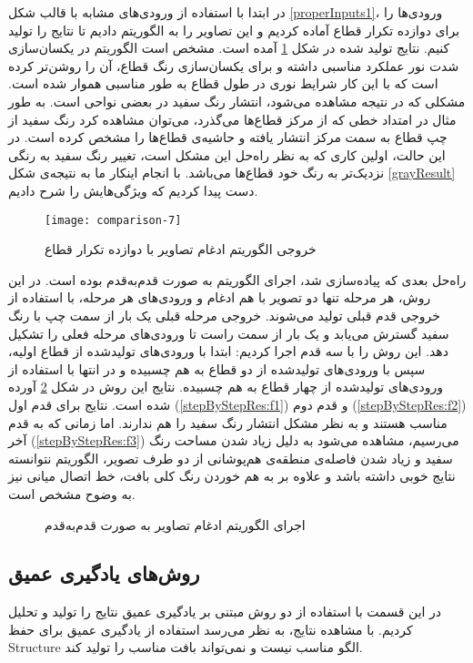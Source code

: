 در ابتدا با استفاده از ورودی‌های مشابه با قالب شکل \ref{properInputs1}، ورودی‌ها را برای دوازده تکرار قطاع آماده کردیم و این تصاویر را به الگوریتم دادیم تا نتایج را تولید کنیم. نتایج تولید شده در شکل \ref{twelveRep} آمده است. مشخص است الگوریتم در یکسان‌سازی شدت نور عملکرد مناسبی داشته و برای یکسان‌سازی رنگ قطاع، آن را روشن‌تر کرده است که با این کار شرایط نوری در طول قطاع به طور مناسبی هموار شده است. مشکلی که در نتیجه مشاهده می‌شود، انتشار رنگ سفید در بعضی نواحی است. به طور مثال در امتداد خطی که از مرکز قطاع‌ها می‌گذرد، می‌توان مشاهده کرد رنگ سفید از چپ قطاع به سمت مرکز انتشار یافته و حاشیه‌ی قطاع‌ها را مشخص کرده است. در این حالت، اولین کاری که به نظر راه‌حل این مشکل است، تغییر رنگ سفید به رنگی نزدیک‌تر به رنگ خود قطاع‌ها می‌باشد. با انجام اینکار ما به نتیجه‌ی شکل \ref{grayResult} دست پیدا کردیم که ویژگی‌هایش را شرح دادیم.
\begin{figure}[h!]
	\centering
	\texttt{[image: comparison-7]}
	\caption{خروجی الگوریتم ادغام تصاویر با دوازده تکرار قطاع}
	\label{twelveRep}
\end{figure}

راه‌حل بعدی که پیاده‌سازی شد، اجرای الگوریتم به صورت قدم‌به‌قدم بوده است. در این روش، هر مرحله تنها دو تصویر با هم ادغام و ورودی‌های هر مرحله، با استفاده از خروجی قدم قبلی تولید می‌شوند. خروجی مرحله قبلی یک بار از سمت چپ با رنگ سفید گسترش می‌یابد و یک بار از سمت راست تا ورودی‌های مرحله فعلی را تشکیل دهد. این روش را با سه قدم اجرا کردیم: ابتدا با ورودی‌های تولید‌شده از قطاع اولیه، سپس با ورودی‌های تولید‌شده از دو قطاع به هم چسبیده و در انتها با استفاده از ورودی‌های تولید‌شده از چهار قطاع به هم چسبیده. نتایج این روش در شکل \ref{stepByStepRes} آورده شده است. نتایج برای قدم اول (\ref{stepByStepRes:f1}) و قدم دوم (\ref{stepByStepRes:f2}) مناسب هستند و به نظر مشکل انتشار رنگ سفید را هم ندارند. اما زمانی که به قدم آخر (\ref{stepByStepRes:f3}) می‌رسیم، مشاهده می‌شود به دلیل زیاد شدن مساحت رنگ سفید و زیاد شدن فاصله‌ی منطقه‌ی هم‌پوشانی از دو طرف تصویر، الگوریتم نتوانسته نتایج خوبی داشته باشد و علاوه بر به هم خوردن رنگ کلی بافت، خط اتصال میانی نیز به وضوح مشخص است.
\begin{figure}[h!]
	\centering
	\qquad
	\qquad
	\caption{اجرای الگوریتم ادغام تصاویر به صورت قدم‌به‌قدم}
	\label{stepByStepRes}
\end{figure}

\subsection{روش‌های یادگیری عمیق} \label{deepLearningRes}
در این قسمت با استفاده از دو روش مبتنی بر یادگیری عمیق  نتایج را تولید و تحلیل کردیم. با مشاهده نتایج، به نظر می‌رسد استفاده از یادگیری عمیق برای حفظ \gls{Structure} الگو مناسب نیست و نمی‌تواند بافت مناسب را تولید کند.


